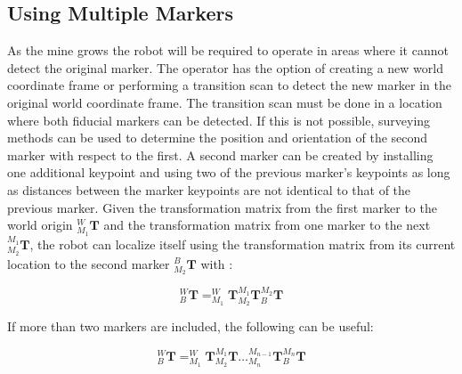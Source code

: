 \subsection{Using Multiple Markers}

As the mine grows the robot will be required to operate in areas where it cannot detect the original marker. The operator has the option of creating a new world coordinate frame or performing a transition scan to detect the new marker in the original world coordinate frame. The transition scan must be done in a location where both fiducial markers can be detected. If this is not possible, surveying methods can be used to determine the position and orientation of the second marker with respect to the first. A second marker can be created by installing one additional keypoint and using two of the previous marker's keypoints as long as distances between the marker keypoints are not identical to that of the previous marker. Given the transformation matrix from the first marker to the world origin $^{W}_{M_1}\mathbf{T}$ and the transformation matrix from one marker to the next $^{M_1}_{M_2}\mathbf{T}$, the robot can localize itself using the transformation matrix from its current location to the second marker $^{B}_{M_2}\mathbf{T}$ with :

\begin{equation}
\label{eq:mtmat}
    ^{W}_{B}\mathbf{T} = ^{W}_{M_1}\mathbf{T}^{M_1}_{M_2}\mathbf{T}^{M_2}_{B}\mathbf{T}
\end{equation}

If more than two markers are included, the following can be useful:

\begin{equation}
\label{eq:mmtmat}
   ^{W}_{B}\mathbf{T} = ^{W}_{M_1}\mathbf{T}^{M_1}_{M_2}\mathbf{T}\hdots^{M_{n-1}}_{M_n}\mathbf{T}^{M_n}_{B}\mathbf{T}
\end{equation}

